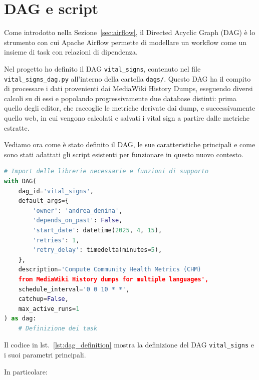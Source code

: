 \section{DAG e script}
\label{sec:dag_script}

Come introdotto nella Sezione~\ref{sec:airflow}, il Directed Acyclic Graph (DAG) è lo strumento con cui Apache Airflow permette di modellare un workflow come un insieme di task con relazioni di dipendenza.

Nel progetto ho definito il DAG \texttt{vital\_signs}, contenuto nel file \texttt{vital\_signs\_dag.py} all’interno della cartella \texttt{dags/}. Questo DAG ha il compito di processare i dati provenienti dai MediaWiki History Dumps, eseguendo diversi calcoli su di essi e popolando progressivamente due database distinti: prima quello degli editor, che raccoglie le metriche derivate dai dump, e successivamente quello web, in cui vengono calcolati e salvati i vital sign a partire dalle metriche estratte.

Vediamo ora come è stato definito il DAG, le sue caratteristiche principali e come sono stati adattati gli script esistenti per funzionare in questo nuovo contesto.


\begin{lstlisting}[language=Python, caption=Definizione del DAG in Airflow, label=lst:dag_definition, basicstyle=\scriptsize\ttfamily, showstringspaces=false]
# Import delle librerie necessarie e funzioni di supporto
with DAG(
    dag_id='vital_signs',
    default_args={
        'owner': 'andrea_denina',
        'depends_on_past': False,
        'start_date': datetime(2025, 4, 15),
        'retries': 1,
        'retry_delay': timedelta(minutes=5),
    },
    description='Compute Community Health Metrics (CHM)
    from MediaWiki History dumps for multiple languages',
    schedule_interval='0 0 10 * *',
    catchup=False,
    max_active_runs=1
) as dag:
    # Definizione dei task
\end{lstlisting}

Il codice in lst.~\ref{lst:dag_definition} mostra la definizione del DAG \texttt{vital\_signs} e i suoi parametri principali.

In particolare:

